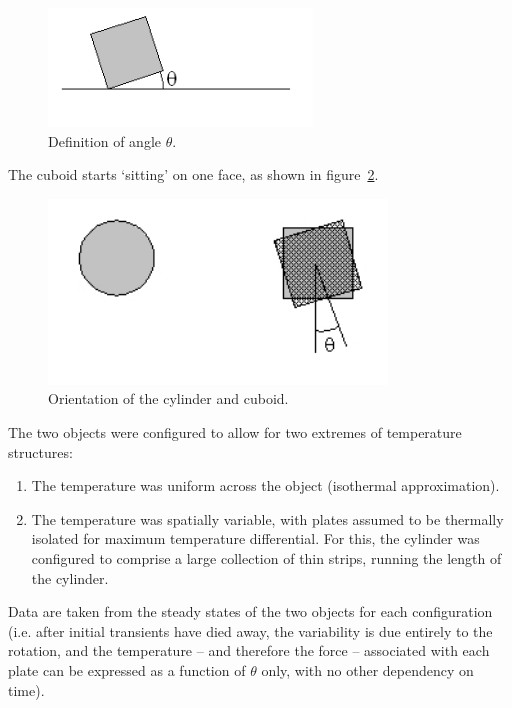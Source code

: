 \begin{description}
    \begin{figure}[!ht]
      \begin{center}
      \includegraphics[width=70mm]{figs/isoth_app/iso_app_figs4.jpg}
      \end{center}
      \caption{Definition of angle $\theta$.}
      \label{fig:ivv_isotherm_fig4}
    \end{figure}

    The cuboid starts `sitting' on one face, as shown
    in figure~\ref{fig:ivv_plate_model_fig1}.
    \begin{figure}[!ht]
      \begin{center}
      \includegraphics[width=90mm]{figs/cyl_cub_comp/cyl_cub_fig1.jpg}
      \end{center}
      \caption{Orientation of the cylinder and cuboid.}
      \label{fig:ivv_plate_model_fig1}
    \end{figure}

    The two objects were configured to allow for two extremes of temperature
    structures:
    \begin{enumerate}
     \item{}The temperature was uniform across the object (isothermal
     approximation).
     \item{}The temperature was spatially variable, with plates assumed to be
       thermally isolated for maximum temperature differential.  For this, the
       cylinder was configured to comprise a large collection of thin strips,
       running the length of the cylinder.
    \end{enumerate}

    Data are taken from the steady states of the two objects for
    each configuration (i.e. after initial transients have died away, the variability is due entirely to the rotation, and the temperature -- and therefore the force -- associated with each plate can be expressed as a function of $\theta$ only, with no other dependency on time).


\end{description}
